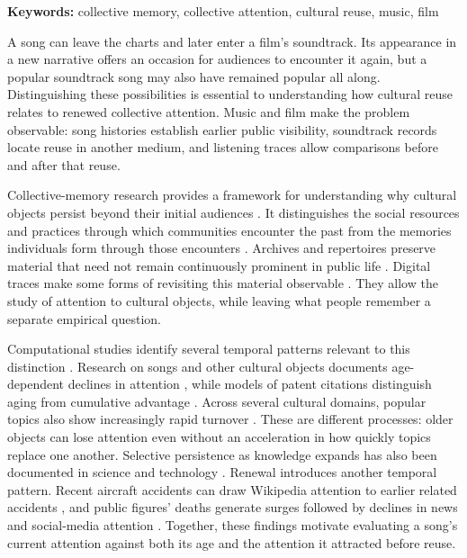 \documentclass[10pt]{article}
\begin{document}
\noindent\textbf{Keywords:} collective memory, collective attention, cultural reuse, music, film

\medskip

A song can leave the charts and later enter a film's soundtrack. Its appearance in a new narrative offers an occasion for audiences to encounter it again, but a popular soundtrack song may also have remained popular all along. Distinguishing these possibilities is essential to understanding how cultural reuse relates to renewed collective attention. Music and film make the problem observable: song histories establish earlier public visibility, soundtrack records locate reuse in another medium, and listening traces allow comparisons before and after that reuse.

Collective-memory research provides a framework for understanding why cultural objects persist beyond their initial audiences \citep{Halbwachs1992,Nora1989,Assmann1995,Hirst2018}. It distinguishes the social resources and practices through which communities encounter the past from the memories individuals form through those encounters \citep{Hirst2008}. Archives and repertoires preserve material that need not remain continuously prominent in public life \citep{Assmann2008,Assmann2011}. Digital traces make some forms of revisiting this material observable \citep{yasseri2022collective}. They allow the study of attention to cultural objects, while leaving what people remember a separate empirical question.

Computational studies identify several temporal patterns relevant to this distinction \citep{Candia2025TemporalDynamicsCSS}. Research on songs and other cultural objects documents age-dependent declines in attention \citep{Candia2019}, while models of patent citations distinguish aging from cumulative advantage \citep{Higham2017}. Across several cultural domains, popular topics also show increasingly rapid turnover \citep{Lorenz-Spreen2019}. These are different processes: older objects can lose attention even without an acceleration in how quickly topics replace one another. Selective persistence as knowledge expands has also been documented in science and technology \citep{CandiaUzzi2021SelectiveForgetting}. Renewal introduces another temporal pattern. Recent aircraft accidents can draw Wikipedia attention to earlier related accidents \citep{Garcia-Gavilanes2017}, and public figures' deaths generate surges followed by declines in news and social-media attention \citep{West2021}. Together, these findings motivate evaluating a song's current attention against both its age and the attention it attracted before reuse.
\end{document}
